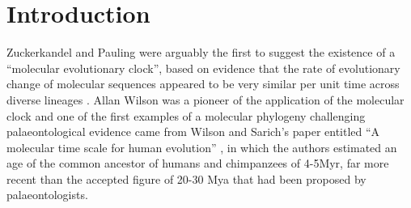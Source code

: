 \section{Introduction} 
Zuckerkandel and Pauling were arguably the first to suggest the existence of a ``molecular evolutionary clock'', based on evidence that the rate of evolutionary change of molecular sequences appeared to be very similar per unit time across diverse lineages \cite{zuckerkandl1965}. Allan Wilson was a pioneer of the application of the molecular clock and one of the first examples of a molecular phylogeny challenging palaeontological evidence came from Wilson and Sarich's paper entitled ``A molecular time scale for human evolution'' \cite{WilsonSarich1969}, in which the authors estimated an age of the common ancestor of humans and chimpanzees of 4-5Myr, far more recent than the accepted figure of 20-30 Mya that had been proposed by palaeontologists.
  
  
  
  
  
  
  
  
  
  